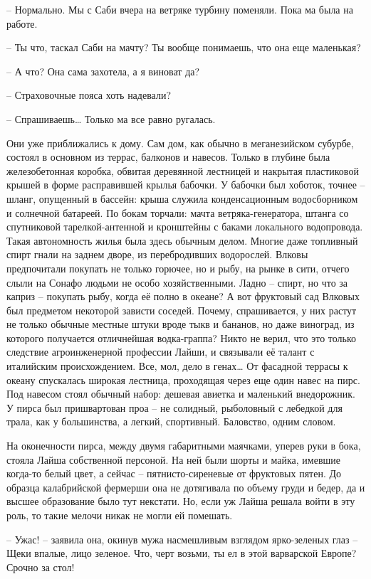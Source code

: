 -- Нормально. Мы с Саби вчера на ветряке турбину поменяли. Пока ма была на работе.

-- Ты что, таскал Саби на мачту? Ты вообще понимаешь, что она еще маленькая?

-- А что? Она сама захотела, а я виноват да?

-- Страховочные пояса хоть надевали?

-- Спрашиваешь\ldots{} Только ма все равно ругалась.

Они уже приближались к дому. Сам дом, как обычно в меганезийском субурбе, состоял в основном из террас, балконов и навесов. Только в глубине была железобетонная коробка, обвитая деревянной лестницей и накрытая пластиковой крышей в форме расправившей крылья бабочки. У бабочки был хоботок, точнее -- шланг, опущенный в бассейн: крыша служила конденсационным водосборником и солнечной батареей. По бокам торчали: мачта ветряка-генератора, штанга со спутниковой тарелкой-антенной и кронштейны с баками локального водопровода. Такая автономность жилья была здесь обычным делом. Многие даже топливный спирт гнали на заднем дворе, из перебродивших водорослей. Влковы предпочитали покупать не только горючее, но и рыбу, на рынке в сити, отчего слыли на Сонафо людьми не особо хозяйственными. Ладно -- спирт, но что за каприз -- покупать рыбу, когда её полно в океане? А вот фруктовый сад Влковых был предметом некоторой зависти соседей. Почему, спрашивается, у них растут не только обычные местные штуки вроде тыкв и бананов, но даже виноград, из которого получается отличнейшая водка-граппа? Никто не верил, что это только следствие агроинженерной профессии Лайши, и связывали её талант с италийским происхождением. Все, мол, дело в генах\ldots{} От фасадной террасы к океану спускалась широкая лестница, проходящая через еще один навес на пирс. Под навесом стоял обычный набор: дешевая авиетка и маленький внедорожник. У пирса был пришвартован проа -- не солидный, рыболовный с лебедкой для трала, как у большинства, а легкий, спортивный. Баловство, одним словом.

На оконечности пирса, между двумя габаритными маячками, уперев руки в бока, стояла Лайша собственной персоной. На ней были шорты и майка, имевшие когда-то белый цвет, а сейчас -- пятнисто-сиреневые от фруктовых пятен. До образца калабрийской фермерши она не дотягивала по объему груди и бедер, да и высшее образование было тут некстати. Но, если уж Лайша решала войти в эту роль, то такие мелочи никак не могли ей помешать.

-- Ужас! -- заявила она, окинув мужа насмешливым взглядом ярко-зеленых глаз -- Щеки впалые, лицо зеленое. Что, черт возьми, ты ел в этой варварской Европе? Срочно за стол!

